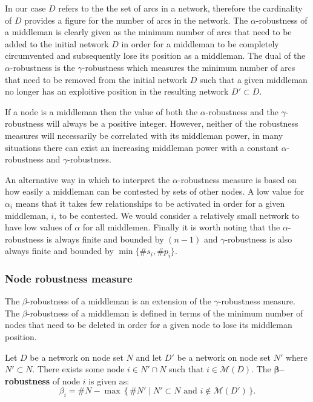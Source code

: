 In our case $D$ refers to the the set of arcs in a network, therefore the cardinality of $D$ provides a figure for the number of arcs in the network. The $\alpha$-robustness of a middleman is clearly given as the minimum number of arcs that need to be added to the initial network $D$ in order for a middleman to be completely circumvented and subsequently lose its position as a middleman. The dual of the $\alpha$-robustness is the $\gamma$-robustness which measures the minimum number of arcs that need to be removed from the initial network $D$ such that a given middleman no longer has an exploitive position in the resulting network $D' \subset D$.

If a node is a middleman then the value of both the $\alpha$-robustness and the $\gamma$-robustness will always be a positive integer. However, neither of the robustness measures will necessarily be correlated with its middleman power, in many situations there can exist an increasing middleman power with a constant $\alpha$-robustness and $\gamma$-robustness.

An alternative way in which to interpret the $\alpha$-robustness measure is based on how easily a middleman can be contested by sets of other nodes. A low value for $\alpha_{i}$ means that it takes few relationships to be activated in order for a given middleman, $i$, to be contested. We would consider a relatively small network to have low values of $\alpha$ for all middlemen. Finally it is worth noting that the $\alpha$-robustness is always finite and bounded by $(n-1)$ and $\gamma$-robustness is also always finite and bounded by $\min \{ \# s_{i}, \# p_{i} \}$. 

\subsubsection{Node robustness measure}

The $\beta$-robustness of a middleman is an extension of the $\gamma$-robustness measure. The $\beta$-robustness of a middleman is defined in terms of the minimum number of nodes that need to be deleted in order for a given node to lose its middleman position.

\begin{definition}
Let $D$ be a network on node set $N$ and let $D'$ be a network on node set $N'$ where $N' \subset N$. There exists some node $i \in N' \cap N$ such that $i \in \mathcal{M}(D)$. The \textbf{$\mathbf{\beta}$--robustness} of node $i$ is given as:
\begin{equation}
\beta_{i} = \# N - \max \, \{ \, \# N' \mid N' \subset N \mbox{ and } i \notin \mathcal{M}(D') \, \} . 
\end{equation}
\end{definition}

